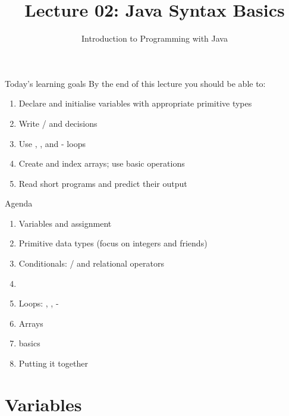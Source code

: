 \documentclass[aspectratio=169,11pt]{beamer}
\title{Lecture 02: Java Syntax Basics}
\subtitle{Introduction to Programming with Java}
\begin{document}
    \begin{frame}
        \titlepage
    \end{frame}

    \begin{frame}{Today's learning goals}
        By the end of this lecture you should be able to:
        \begin{enumerate}
            \item Declare and initialise variables with appropriate primitive types
            \item Write / and  decisions
            \item Use , , and - loops
            \item Create and index arrays; use basic  operations
            \item Read short programs and predict their output
        \end{enumerate}
    \end{frame}

    \begin{frame}{Agenda}
        \begin{enumerate}
            \item Variables and assignment
            \item Primitive data types (focus on integers and friends)
            \item Conditionals: / and relational operators
            \item {}
            \item Loops: , , -
            \item Arrays
            \item {} basics
            \item Putting it together
        \end{enumerate}
    \end{frame}

    \section{Variables}
\end{document}
